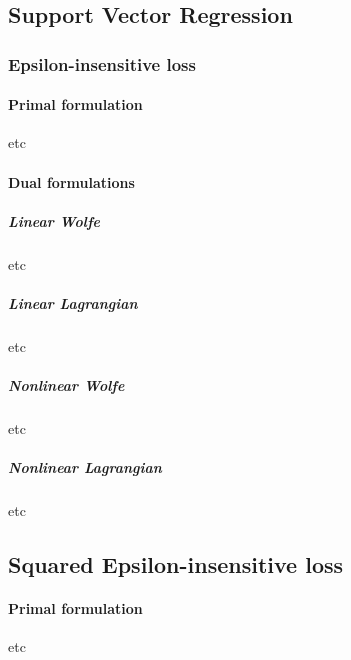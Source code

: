 \subsection{Support Vector Regression}


\subsubsection{Epsilon-insensitive loss}

\paragraph{Primal formulation}

etc



\paragraph{Dual formulations}

\subparagraph{Linear Wolfe}

etc



\subparagraph{Linear Lagrangian}

etc



\subparagraph{Nonlinear Wolfe}

etc



\subparagraph{Nonlinear Lagrangian}

etc




\subsection{Squared Epsilon-insensitive loss}

\paragraph{Primal formulation}

etc



